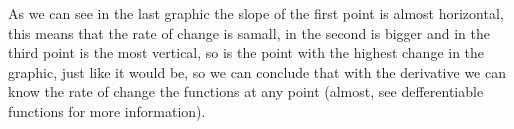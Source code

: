 \documentclass[12pt,journal]{IEEEtran}
\begin{document}

    As we can see in the last graphic the slope of the first point is almost 
    horizontal, this means that the rate of change is samall, in the second
    is bigger and in the third point is the most vertical, so is the point with
    the highest change in the graphic, just like it would be, so we can
    conclude that with the derivative we can know the rate of change the
    functions at any point (almost, see defferentiable functions for more
    information).
\end{document}
